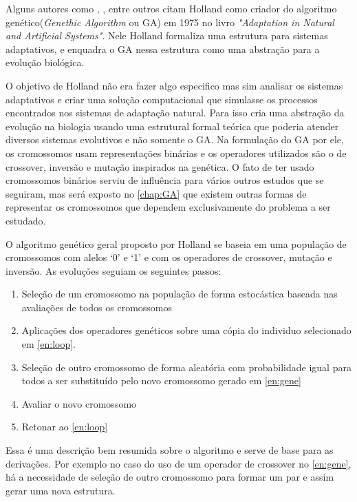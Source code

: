 Alguns autores como \citeauthor{Mitchell1996}, \citeauthor{LeeJacobson2015}, \citeauthor{Kwong2001} entre outros citam Holland como criador do algoritmo genético(\textit{Genethic Algorithm} ou GA) em 1975 no livro \textit{"Adaptation in Natural and Artificial Systems"}. Nele Holland formaliza uma estrutura para sistemas adaptativos, e enquadra o GA nessa estrutura como uma abstração para a evolução biológica.

O objetivo de Holland não era fazer algo especifico mas sim analisar os sistemas adaptativos e criar uma solução computacional que simulasse os processos encontrados nos sistemas de adaptação natural. Para isso cria uma abstração da evolução na biologia usando uma estrutural formal teórica que poderia atender diversos sistemas evolutivos e não somente o GA. Na formulação do GA por ele, os cromossomos usam representações binárias e os operadores utilizados são o de crossover, inversão e mutação inspirados na genética. O fato de ter usado cromossomos binários serviu de influência para vários outros estudos que se seguiram, mas será exposto no \autoref{chap:GA} que existem outras formas de representar os cromossomos que dependem exclusivamente do problema a ser estudado.

O algoritmo genético geral proposto por Holland se baseia em uma população de cromossomos com alelos `0' e `1' e com os operadores de crossover, mutação e inversão. As evoluções seguiam os seguintes passos: 
\begin{enumerate}
	\item \label{en:loop} Seleção de um cromossomo na população de forma estocástica baseada nas avaliações de todos os cromossomos
	\item \label{en:gene} Aplicações dos operadores genéticos sobre uma cópia do individuo selecionado em \ref{en:loop}.
	\item Seleção de outro cromossomo de forma aleatória com probabilidade igual para todos a ser substituído pelo novo cromossomo gerado em \ref{en:gene}
	\item Avaliar o novo cromossomo
	\item Retonar ao \ref{en:loop}
\end{enumerate}

Essa é uma descrição bem resumida sobre o algoritmo e serve de base para as derivações. Por exemplo no caso do uso de um operador de crossover no \autoref{en:gene}, há a necessidade de seleção de outro cromossomo para formar um par e assim gerar uma nova estrutura.

